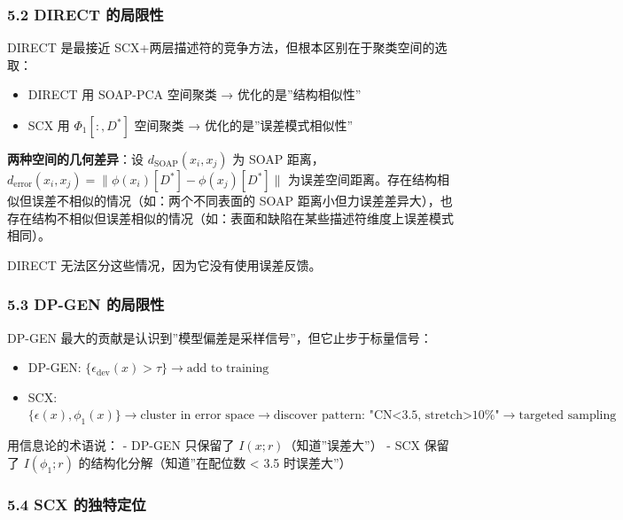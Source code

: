 \documentclass[
  12pt,
]{ctexart}
\providecommand{\tightlist}{%
  \setlength{\itemsep}{0pt}\setlength{\parskip}{0pt}}
\begin{document}
\subsubsection{5.2 DIRECT
的局限性}\label{direct-ux7684ux5c40ux9650ux6027}

DIRECT 是最接近 SCX+两层描述符的竞争方法，但根本区别在于聚类空间的选取：

\begin{itemize}
\tightlist
\item
  DIRECT 用 SOAP-PCA 空间聚类 → 优化的是''结构相似性''
\item
  SCX 用 \(\Phi_1[:, D^*]\) 空间聚类 → 优化的是''误差模式相似性''
\end{itemize}

\textbf{两种空间的几何差异}：设 \(d_{\text{SOAP}}(x_i, x_j)\) 为 SOAP
距离，\(d_{\text{error}}(x_i, x_j) = \|\phi(x_i)[D^*] - \phi(x_j)[D^*]\|\)
为误差空间距离。存在结构相似但误差不相似的情况（如：两个不同表面的 SOAP
距离小但力误差差异大），也存在结构不相似但误差相似的情况（如：表面和缺陷在某些描述符维度上误差模式相同）。

DIRECT 无法区分这些情况，因为它没有使用误差反馈。

\subsubsection{5.3 DP-GEN
的局限性}\label{dp-gen-ux7684ux5c40ux9650ux6027}

DP-GEN 最大的贡献是认识到''模型偏差是采样信号''，但它止步于标量信号：

\begin{itemize}
\tightlist
\item
  DP-GEN:
  \(\{\epsilon_{\text{dev}}(x) > \tau\} \rightarrow \text{add to training}\)
\item
  SCX:
  \(\{\epsilon(x), \phi_1(x)\} \rightarrow \text{cluster in error space} \rightarrow \text{discover pattern: "CN<3.5, stretch>10%
  \)
\end{itemize}

用信息论的术语说： - DP-GEN 只保留了 \(I(x; r)\)（知道''误差大''） - SCX
保留了 \(I(\phi_1; r)\) 的结构化分解（知道''在配位数 \textless{} 3.5
时误差大''）

\subsubsection{5.4 SCX
的独特定位}\label{scx-ux7684ux72ecux7279ux5b9aux4f4d}
\end{document}
